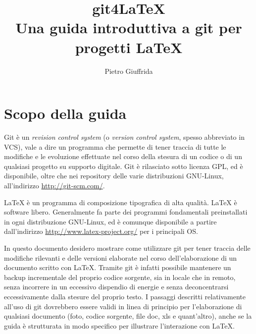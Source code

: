 \documentclass[a4paper,12pt,oneside]{article}
\begin{document}

\title{git4\LaTeX \\
  Una guida introduttiva a git per progetti \LaTeX}
\author{Pietro Giuffrida}
\maketitle
\clearpage
\tableofcontents
\clearpage
\section{Scopo della guida}
Git è un \emph{revision control system} (o \emph{version control system}, spesso
abbreviato in VCS), vale a dire un programma che permette di tener traccia di
tutte le modifiche e le evoluzione effettuate nel corso della stesura di un
codice o di un qualsiasi progetto su supporto digitale. Git è rilasciato sotto
licenza GPL, ed è disponibile, oltre che nei repository delle varie distribuzioni
GNU-Linux, all'indirizzo \url{http://git-scm.com/}.

\LaTeX{} è un programma di composizione tipografica di alta qualità. \LaTeX{} è
software libero. Generalmente fa parte dei programmi fondamentali preinstallati in
ogni distribuzione GNU-Linux, ed è comunque disponibile a partire dall'indirizzo
\url{http://www.latex-project.org/} per i principali OS.

In questo documento desidero mostrare come utilizzare git per tener traccia
delle modifiche rilevanti e delle versioni elaborate nel corso dell'elaborazione
di un documento scritto con \LaTeX. Tramite git è infatti possibile mantenere un
backup incrementale del proprio codice sorgente, sia in locale che in remoto,
senza incorrere in un eccessivo dispendio di energie e senza deconcentrarsi
eccessivamente dalla stesure del proprio testo. I passaggi descritti
relativamente all'uso di git dovrebbero essere validi in linea di principio per
l'elaborazione di qualsiasi documento (foto, codice sorgente, file doc, xls
e quant'altro), anche se la guida è strutturata in modo specifico per
illustrare l'interazione con \LaTeX.
\end{document}

